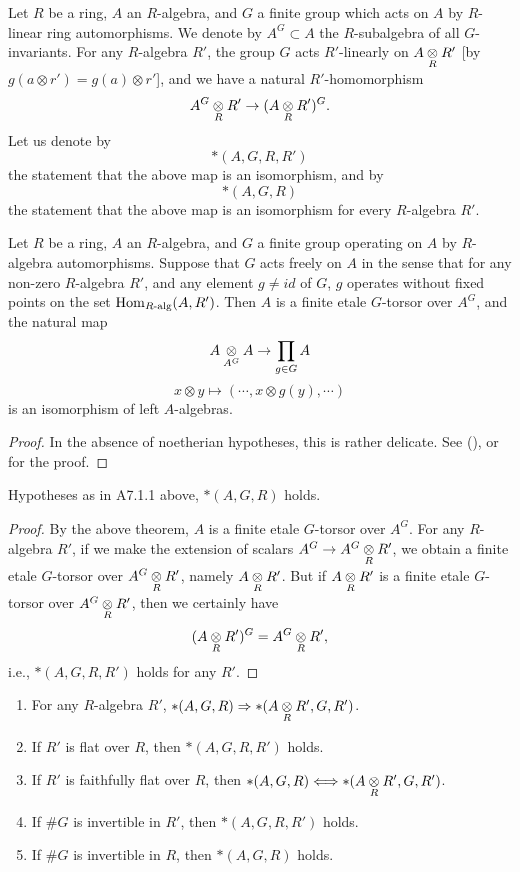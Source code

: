 Let $R$ be a ring, $A$ an $R$-algebra, and $G$ a finite group which acts on $A$ by $R$-linear ring automorphisms. We denote by $A^G \subset A$ the $R$-subalgebra of all $G$-invariants. For any $R$-algebra $R'$, the group $G$ acts $R'$-linearly on $A \underset{R}{\otimes} R'$ [by $g(a \otimes r') = g(a) \otimes r'$], and we have a natural $R'$-homomorphism
\[
A^G \underset{R}{\otimes} R' \to (A \underset{R}{\otimes} R')^G .
\]
Let us denote by
\[
*(A,G,R,R')
\]
the statement that the above map is an isomorphism, and by
\[
*(A,G,R)
\]
the statement that the above map is an isomorphism for every $R$-algebra $R'$.

\begin{appthm}\label{thm:A7.1.1}
Let $R$ be a ring, $A$ an $R$-algebra, and $G$ a finite group operating on $A$ by $R$-algebra automorphisms. Suppose that $G$ acts freely on $A$ in the sense that for any non-zero $R$-algebra $R'$, and any element $g \neq id$ of $G$, $g$ operates without fixed points on the set $\operatorname{Hom}_{R\text{-alg}}(A,R')$. Then $A$ is a finite etale $G$-torsor over $A^G$, and the natural map
\[
A \underset{A^G}{\otimes} A \to \prod_{g \in G} A
\]
\[
x \otimes y \mapsto (\cdots, x \otimes g(y), \cdots)
\]
is an isomorphism of left $A$-algebras.
\end{appthm}

\begin{proof}
In the absence of noetherian hypotheses, this is rather delicate. See (\cite[III, Expos\'e V, Thm.~4.1]{SGA}), or \cite[III, \S2,6.1]{DeGa} for the proof.
\end{proof}

\begin{appcor}\label{cor:A7.1.2}
Hypotheses as in A7.1.1 above, $*(A,G,R)$ holds.
\end{appcor}

\begin{proof}
By the above theorem, $A$ is a finite etale $G$-torsor over $A^G$. For any $R$-algebra $R'$, if we make the extension of scalars $A^G \to A^G \underset{R}{\otimes} R'$, we obtain a finite etale $G$-torsor over $A^G \underset{R}{\otimes} R'$, namely $A \underset{R}{\otimes} R'$. But if $A \underset{R}{\otimes} R'$ is a finite etale $G$-torsor over $A^G \underset{R}{\otimes} R'$, then we certainly have
\[
(A \underset{R}{\otimes} R')^G = A^G \underset{R}{\otimes} R' ,
\]
i.e., $*(A,G,R,R')$ holds for any $R'$.
\end{proof}

\begin{appprop}\label{prop:A7.1.3}
\begin{enumerate}[label=(\arabic*), start=0]
\item For any $R$-algebra $R'$, $*(A,G,R) \Rightarrow *(A \underset{R}{\otimes} R', G, R')$.
\item If $R'$ is flat over $R$, then $*(A,G,R,R')$ holds.
\item If $R'$ is faithfully flat over $R$, then $*(A,G,R) \Longleftrightarrow *(A \underset{R}{\otimes} R', G, R')$.
\item If $\#G$ is invertible in $R'$, then $*(A,G,R,R')$ holds.
\item If $\#G$ is invertible in $R$, then $*(A,G,R)$ holds.
\end{enumerate}
\end{appprop}

